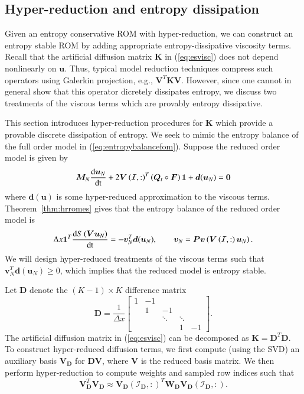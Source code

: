 \documentclass[preprint,10pt]{elsarticle}
\theoremstyle{definition}
\theoremstyle{lemma}
\theoremstyle{theorem}
\theoremstyle{assumption}
\newcommand{\td}[2]{\frac{{\rm d}#1}{{\rm d}{\rm #2}}}
\newcommand{\LRp}[1]{\left( #1 \right)}
\begin{document}
\subsection{Hyper-reduction and entropy dissipation}
\label{sec:diss}

Given an entropy conservative ROM with hyper-reduction, we can construct an entropy stable ROM by adding appropriate entropy-dissipative viscosity terms.  Recall that the artificial diffusion matrix $\bm{K}$ in (\ref{eq:esvisc}) does not depend nonlinearly on $\bm{u}$.  Thus, typical model reduction techniques compress such operators using Galerkin projection, e.g., $\bm{V}^T\bm{K}\bm{V}$.  However, since one cannot in general show that this operator dicretely dissipates entropy, we discuss two treatments of the viscous terms which are provably entropy dissipative.  

This section introduces hyper-reduction procedures for $\bm{K}$ which provide a provable discrete dissipation of entropy.  We seek to mimic the entropy balance of the full order model in (\ref{eq:entropybalancefom}).  Suppose the reduced order model is given by 
\[
\bm{M}_N\td{\bm{u}_N}{t} + 2\bm{V}\LRp{\mathcal{I},:}^T\LRp{\bm{Q}_t \circ \bm{F}}\bm{1} + \bm{d}(\bm{u}_N)= \bm{0}
\]
where $\bm{d}(\bm{u})$ is some hyper-reduced approximation to the viscous terms.  Theorem~\ref{thm:hrromes} gives that the entropy balance of the reduced order model is
\[
\Delta x \bm{1}^T\td{S\LRp{\bm{V}\bm{u}_N}}{t} = -\bm{v}_N^T\bm{d}(\bm{u}_N), \qquad \bm{v}_N = \bm{P}\bm{v}\LRp{\bm{V}\LRp{\mathcal{I},:}\bm{u}_N}.
\]
We will design hyper-reduced treatments of the viscous terms such that $\bm{v}_N^T\bm{d}(\bm{u}_N) \geq 0$, which implies that the reduced model is entropy stable.  

Let $\bm{D}$ denote the $(K-1)\times K$ difference matrix
\[
\bm{D} = \frac{1}{\Delta x}\begin{bmatrix}
1 & -1 &&& \\
 & 1 & -1 && \\
 & & \ddots & \ddots&\\
&  & & 1 & -1
\end{bmatrix}.
\]
The artificial diffusion matrix in (\ref{eq:esvisc}) can be decomposed as $\bm{K} = \bm{D}^T\bm{D}$.  To construct hyper-reduced diffusion terms, we first compute (using the SVD) an auxiliary basis $\bm{V}_{\bm{D}}$ for $\bm{D}\bm{V}$, where $\bm{V}$ is the reduced basis matrix.  We then perform hyper-reduction to compute weights and sampled row indices such that 
\[
\bm{V}_{\bm{D}}^T\bm{V}_{\bm{D}} \approx \bm{V}_{\bm{D}}\LRp{\mathcal{I}_{\bm{D}},:}^T \bm{W}_{\bm{D}}\bm{V}_{\bm{D}}\LRp{\mathcal{I}_{\bm{D}},:}.
\]
\end{document}
